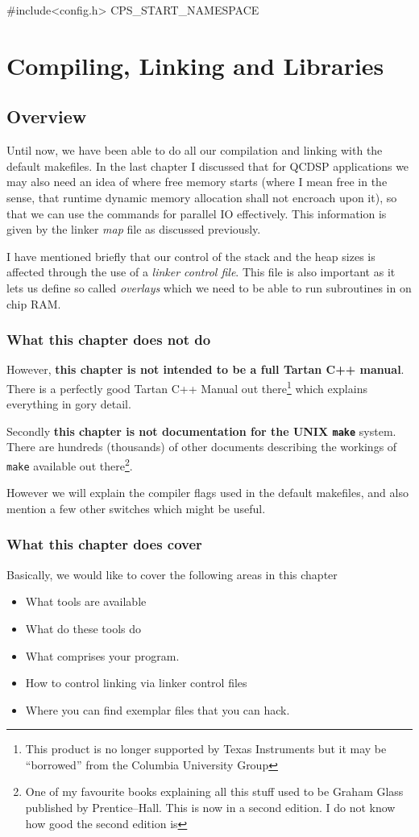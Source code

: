 #include<config.h>
CPS_START_NAMESPACE
\chapter{Compiling, Linking and Libraries}
\section{Overview}
Until now, we have been able to do all our compilation and linking
with the default makefiles. In the last chapter I discussed that
for QCDSP applications we may also need an idea of where free memory
starts (where I mean free in the sense, that runtime dynamic memory 
allocation shall not encroach upon it), so that we can use the 
commands for parallel IO effectively. This information is given by
the linker {\em map} file as discussed previously.

I have mentioned briefly that our control of the stack and the heap 
sizes is affected through the use of a {\em linker control file}. This 
file is also important as it lets us define so called {\em overlays}
which we need to be able to run subroutines in on chip RAM.

\subsection{What this chapter does not do}
However, {\bf this chapter is not intended to be a full Tartan C++ manual}.
There is a perfectly good Tartan C++ Manual out there\footnote{This product is no longer supported by Texas Instruments but it may be ``borrowed'' from the 
Columbia University Group} which explains everything in gory detail.

Secondly {\bf this chapter is not documentation for the UNIX {\tt make}}
system. There are hundreds (thousands) of other documents describing the 
workings of {\tt make} available out there\footnote{One of my favourite books explaining all this stuff used to be Graham Glass published by Prentice--Hall. This is now in a second edition. I do not know how good the second edition is}.

However we will explain the compiler flags used in the default makefiles, 
and also mention a few other switches which might be useful. 

\subsection{What this chapter does cover}
Basically, we would like to cover the following areas in this chapter
\begin{itemize}
\item
What tools are available
\item
What do these tools do
\item
What comprises your program.
\item
How to control linking via linker control files
\item
Where you can find exemplar files that you can hack.
\end{itemize}

